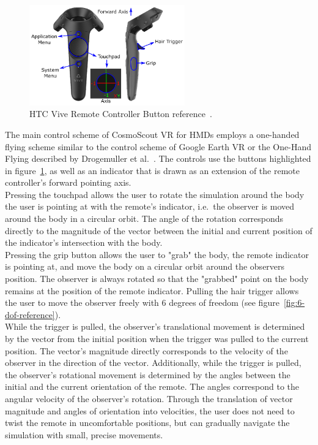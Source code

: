 \begin{figure}[h]
    \centering
    \includegraphics[width=0.6\textwidth]{content/3_current_state/img/ViveControllerButtons[BAA2017]}
    \caption{HTC Vive Remote Controller Button reference~\cite{BAA2017}.}
    \label{fig:controller-reference}
\end{figure}
The main control scheme of CosmoScout VR for HMDs employs a one-handed flying scheme similar to the control scheme of
Google Earth VR or the One-Hand Flying described by Drogemuller et al.~\cite{Drogemuller2020}.
The controls use the buttons highlighted in figure~\ref{fig:controller-reference}, as well as an indicator that is
drawn as an extension of the remote controller's forward pointing axis.
\\
Pressing the touchpad allows the user to rotate the simulation around the body the user is pointing at with the
remote's indicator, i.e.\ the observer is moved around the body in a circular orbit.
The angle of the rotation corresponds directly to the magnitude of the vector between the initial and current position
of the indicator's intersection with the body.
\\
Pressing the grip button allows the user to "grab" the body, the remote indicator is pointing at, and move the body
on a circular orbit around the observers position.
The observer is always rotated so that the "grabbed" point on the body remains at the position of the remote indicator.
Pulling the hair trigger allows the user to move the observer freely with 6 degrees of freedom (see
figure~\ref{fig:6-dof-reference}).
\\
While the trigger is pulled, the observer's translational movement is determined by the vector from the initial
position when the trigger was pulled to the current position.
The vector's magnitude directly corresponds to the velocity of the observer in the direction of the vector.
Additionally, while the trigger is pulled, the observer's rotational movement is determined by the angles between the
initial and the current orientation of the remote.
The angles correspond to the angular velocity of the observer's rotation.
Through the translation of vector magnitude and angles of orientation into velocities, the user does not need to
twist the remote in uncomfortable positions, but can gradually navigate the simulation with small, precise movements.


